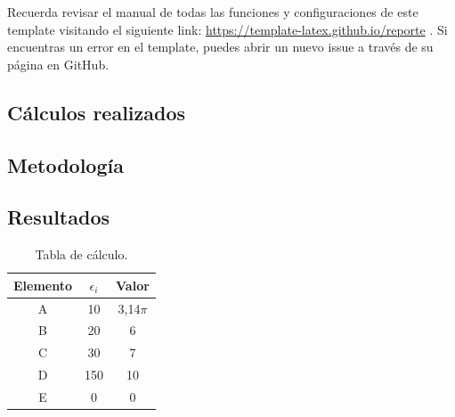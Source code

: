 	Recuerda revisar el manual de todas las funciones y configuraciones de este template visitando el siguiente link: \url{https://template-latex.github.io/reporte} \cite{template}. Si encuentras un error en el template, puedes abrir un nuevo issue a través de su página en GitHub.





\begin{appendixd}

	\section{Cálculos realizados}

	\subsection{Metodología}
	\lipsum[1-2]


	\subsection{Resultados}
	\lipsum[10]

	\enabletablerowcolor[2] %
	\begin{table}[H]
		\centering
		\caption{Tabla de cálculo.}
		\begin{tabular}{ccc}
			\hline
			\textbf{Elemento} & $\epsilon_i$ & \textbf{Valor} \bigstrut\\
			\hline
			A     & 10    & 3,14$\pi$ \\
			B     & 20    & 6 \\
			C     & 30    & 7 \\
			D     & 150    & 10 \\
			E     & 0    & 0 \\
			\hline
			\end{tabular}
		\label{tab:anexo-1}
	\end{table}
	\disabletablerowcolor %


\end{appendixd}
